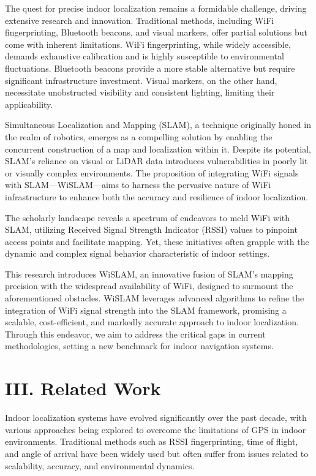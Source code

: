 \documentclass[
	a4paper, %
	11pt, %
	unnumberedsections, %
	twoside, %
]{LTJournalArticle}
\begin{document}
The quest for precise indoor localization remains a formidable challenge, driving extensive research and innovation. Traditional methods, including WiFi fingerprinting, Bluetooth beacons, and visual markers, offer partial solutions but come with inherent limitations. WiFi fingerprinting, while widely accessible, demands exhaustive calibration and is highly susceptible to environmental fluctuations. Bluetooth beacons provide a more stable alternative but require significant infrastructure investment. Visual markers, on the other hand, necessitate unobstructed visibility and consistent lighting, limiting their applicability.

Simultaneous Localization and Mapping (SLAM), a technique originally honed in the realm of robotics, emerges as a compelling solution by enabling the concurrent construction of a map and localization within it. Despite its potential, SLAM's reliance on visual or LiDAR data introduces vulnerabilities in poorly lit or visually complex environments. The proposition of integrating WiFi signals with SLAM—WiSLAM—aims to harness the pervasive nature of WiFi infrastructure to enhance both the accuracy and resilience of indoor localization.

The scholarly landscape reveals a spectrum of endeavors to meld WiFi with SLAM, utilizing Received Signal Strength Indicator (RSSI) values to pinpoint access points and facilitate mapping. Yet, these initiatives often grapple with the dynamic and complex signal behavior characteristic of indoor settings.

This research introduces WiSLAM, an innovative fusion of SLAM's mapping precision with the widespread availability of WiFi, designed to surmount the aforementioned obstacles. WiSLAM leverages advanced algorithms to refine the integration of WiFi signal strength into the SLAM framework, promising a scalable, cost-efficient, and markedly accurate approach to indoor localization. Through this endeavor, we aim to address the critical gaps in current methodologies, setting a new benchmark for indoor navigation systems.

\section{III. Related Work}

Indoor localization systems have evolved significantly over the past decade, with various approaches being explored to overcome the limitations of GPS in indoor environments. Traditional methods such as RSSI fingerprinting, time of flight, and angle of arrival have been widely used but often suffer from issues related to scalability, accuracy, and environmental dynamics.
\end{document}
